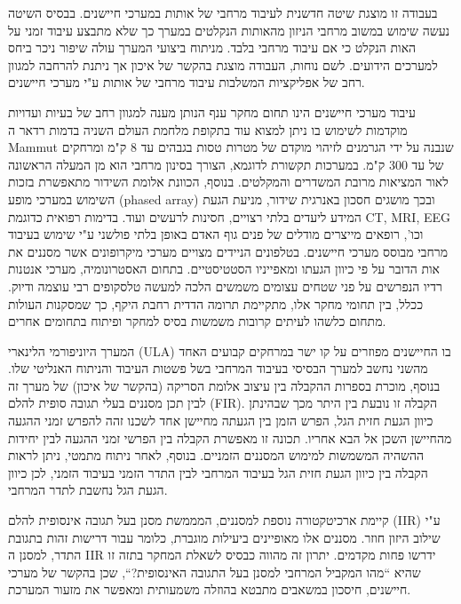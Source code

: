 בעבודה זו מוצגת שיטה חדשנית לעיבוד מרחבי של אותות במערכי חיישנים.
בבסיס השיטה נעשה שימוש במשוב מרחבי הניזון מהאותות הנקלטים במערך כך שלא מתבצע עיבוד זמני על האות הנקלט כי אם עיבוד מרחבי בלבד.
מניתוח ביצועי המערך עולה שיפור ניכר ביחס למערכים הידועים.
לשם נוחות, העבודה מוצגת בהקשר של איכון אך ניתנת להרחבה למגוון רחב של אפליקציות המשלבות עיבוד מרחבי של אותות ע"י מערכי חיישנים. 
\par
עיבוד מערכי חיישנים הינו תחום מחקר ענף הנותן מענה למגוון רחב של בעיות ועדויות מוקדמות לשימוש בו ניתן למצוא עוד בתקופת מלחמת העולם השניה בדמות רדאר ה
\textenglish{Mammut}
שנבנה על ידי הגרמנים לזיהוי מוקדם של מטרות טסות בגבהים עד 8 ק"מ ומרחקים של עד 300 ק"מ.
במערכות תקשורת לדוגמא, הצורך בסינון מרחבי הוא מן המעלה הראשונה לאור המציאות מרובת המשדרים והמקלטים. בנוסף, הכוונת אלומת השידור מתאפשרת בזכות השימוש במערכי מופע
\textenglish{(phased array)}
ובכך מושגים חסכון באנרגית שידור, מניעת הגעת המידע ליעדים בלתי רצויים, חסינות לרעשים ועוד.
בדימות רפואית כדוגמת 
\textenglish{CT, MRI, EEG}
וכו', רופאים מייצרים מודלים של פנים גוף האדם באופן בלתי פולשני ע"י שימוש בעיבוד מרחבי מבוסס מערכי חיישנים.
בטלפונים הניידים מצויים מערכי מיקרופונים אשר מסננים את אות הדובר על פי כיוון הגעתו ומאפייניו הסטטיסטיים.
בתחום האסטרונומיה, מערכי אנטנות רדיו הנפרשים על פני שטחים עצומים משמשים הלכה למעשה טלסקופים רבי עוצמה ודיוק.
ככלל, בין תחומי מחקר אלו, מתקיימת תרומה הדדית רחבת היקף, כך שמסקנות העולות מתחום כלשהו לעיתים קרובות משמשות בסיס למחקר ופיתוח בתחומים אחרים.
\par
המערך היוניפורמי הלינארי
\textenglish{(ULA)}
בו החיישנים מפוזרים על קו ישר במרחקים קבועים האחד מהשני נחשב למערך הבסיסי בעיבוד המרחבי בשל פשטות העיבוד והניתוח האנליטי שלו.
בנוסף, מוכרת בספרות ההקבלה בין עיצוב אלומת הסריקה (בהקשר של איכון) של מערך זה לבין תכן מסננים בעלי תגובה סופית להלם
\textenglish{(FIR)}.
הקבלה זו נובעת בין היתר מכך שבהינתן כיוון הגעת חזית הגל, הפרש הזמן בין הגעתה מחיישן אחד לשכנו זהה להפרש זמני ההגעה מהחיישן השכן אל הבא אחריו. תכונה זו מאפשרת הקבלה בין הפרשי זמני ההגעה לבין יחידות ההשהיה המשמשות למימוש המסננים הזמניים.
בנוסף, לאחר ניתוח מתמטי, ניתן לראות הקבלה בין כיוון הגעת חזית הגל בעיבוד המרחבי לבין התדר הזמני בעיבוד הזמני, לכן כיוון הגעת הגל נחשבת לתדר המרחבי.
\par
קיימת ארכיטקטורה נוספת למסננים, המממשת מסנן בעל תגובה אינסופית להלם 
\textenglish{(IIR)}
ע"י שילוב היזון חוזר.
מסננים אלו מאופיינים ביעילות מוגברת, כלומר עבור דרישות זהות בתגובת התדר, למסנן ה
\textenglish{IIR}
ידרשו פחות מקדמים.
יתרון זה מהווה כבסיס לשאלת המחקר בתזה זו שהיא 
``מהו המקביל המרחבי למסנן בעל התגובה האינסופית?``, שכן בהקשר של מערכי חיישנים, חיסכון במשאבים מתבטא בהוזלה משמעותית ומאפשר את מזעור המערכת.
